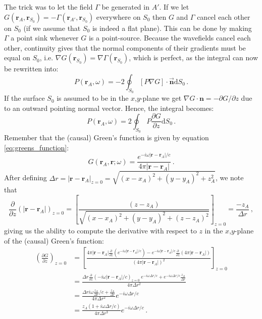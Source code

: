 The trick was to let the field $\Gamma$ be generated in $A'$.
If we let $G(\mathbf r_A, \mathbf r_{S_0}) = - \Gamma (\mathbf r_{A'}, \mathbf r_{S_0})$ everywhere on $S_0$ then $G$ and $\Gamma$ cancel each other on $S_0$ (if we assume that $S_0$ is indeed a flat plane).
This can be done by making $\Gamma$ a point sink whenever $G$ is a point-source.
Because the wavefields cancel each other, continuity gives that the normal components of their gradients must be equal on $S_0$, i.e. $\nabla G(\mathbf r_{S_0}) = \nabla \Gamma (\mathbf r_{S_0})$, which is perfect, as the integral can now be rewritten into:
\begin{equation}
    P(\mathbf r_A, \omega) = - 2\oint_{S_0} [P \nabla G] \cdot \overrightarrow{\mathbf n} \mathrm dS_0 \,.\nonumber
\end{equation}
If the surface $S_0$ is assumed to be in the $x$,$y$-plane we get $\nabla G \cdot \mathbf n = -\partial G / \partial z$ due to an outward pointing normal vector.
Hence, the integral becomes:
\begin{equation}
    P(\mathbf r_A, \omega) = 2\oint_{S_0} P \frac{\partial G}{\partial z} \mathrm dS_0 \,.\label{eq:pre_rayleigh}
\end{equation}
Remember that the (causal) Green's function is given by equation \ref{eq:greens_function}:
\begin{equation}
    G(\mathbf r_A, \mathbf r; \omega) = \frac{e^{-i\omega |\mathbf r-\mathbf r_A|/c}}{4 \pi |\mathbf r- \mathbf r_A|} \,. \nonumber
\end{equation}
After defining $\Delta r = |\mathbf r-\mathbf r_A|_{z=0} = \sqrt{(x-x_A)^2 + (y-y_A)^2 + z_A^2}$, we note that
\begin{equation}
    \frac{\partial}{\partial z} (|\mathbf r-\mathbf r_A|)_{z=0} = \left[ \frac{(z-z_A)}{\sqrt{(x-x_A)^2 + (y-y_A)^2 + (z-z_A)^2}} \right]_{z=0} = \frac{-z_A}{\Delta r} \,, \nonumber
\end{equation}
giving us the ability to compute the derivative with respect to $z$ in the $x$,$y$-plane of the (causal) Green's function:
\begin{align}
    \left( \frac{\partial G}{\partial z} \right)_{z=0} &= \left[ \frac{4\pi |\mathbf r - \mathbf r_A| \frac{\partial}{\partial z} (e^{-i\omega |\mathbf r-\mathbf r_A|/c}) - e^{-i\omega |\mathbf r-\mathbf r_A|/c} \frac{\partial}{\partial z} (4\pi|\mathbf r-\mathbf r_A|) }{(4 \pi |\mathbf r-\mathbf r_A|)^2} \right]_{z=0} \nonumber \\
                                                       &= \frac{\Delta r \frac{\partial}{\partial z}(-i\omega|\mathbf r-\mathbf r_A|/c)_{z=0} \ e^{-i\omega \Delta r/c} + e^{-i\omega \Delta r/c} \frac{z_A}{\Delta r} }{4 \pi \Delta r^2} \nonumber \\
                                                       &= \frac{\Delta r i\omega \frac{z_A}{\Delta r}/c + \frac{z_A}{\Delta r} }{4 \pi \Delta r^2} e^{-i\omega \Delta r/c} \nonumber \\
                                                       &= \frac{z_A(1+i\omega \Delta r/c)}{4 \pi \Delta r^3} e^{-i\omega \Delta r/c} \,.\nonumber
\end{align}
